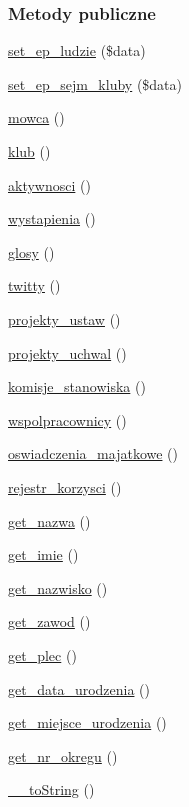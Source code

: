\subsubsection*{Metody publiczne}
\begin{DoxyCompactItemize}
\item 
\hyperlink{classep___posel_a26923a78d5c508d37507edd1b617893c}{set\-\_\-ep\-\_\-ludzie} (\$data)
\item 
\hyperlink{classep___posel_ab890bc062f51edbd126a1b10bd326e71}{set\-\_\-ep\-\_\-sejm\-\_\-kluby} (\$data)
\item 
\hyperlink{classep___posel_a0a281f2a729be7088e24f59b2a897bb6}{mowca} ()
\item 
\hyperlink{classep___posel_aedba85bfa40b8bf60cfad39464010834}{klub} ()
\item 
\hyperlink{classep___posel_af32786fc0cc85c7b2d9d66c3923b3197}{aktywnosci} ()
\item 
\hyperlink{classep___posel_a18b1bf1c04262c23e5edc5c81a4f897c}{wystapienia} ()
\item 
\hyperlink{classep___posel_aab9cc82c80e91ad71187a3c4a9999561}{glosy} ()
\item 
\hyperlink{classep___posel_a8ef2e15fbe3d18191cb256c026a211be}{twitty} ()
\item 
\hyperlink{classep___posel_a77464a8191912ee711ebcaa03fb0bf94}{projekty\-\_\-ustaw} ()
\item 
\hyperlink{classep___posel_a14881c701cfb2df51d012218c1494a51}{projekty\-\_\-uchwal} ()
\item 
\hyperlink{classep___posel_a79f06cfb4c9c98b98876067012f2c413}{komisje\-\_\-stanowiska} ()
\item 
\hyperlink{classep___posel_a7139261a26ea9ad6c952fddb860c80d9}{wspolpracownicy} ()
\item 
\hyperlink{classep___posel_ab7a97df64d38268bc2d006b6666d0275}{oswiadczenia\-\_\-majatkowe} ()
\item 
\hyperlink{classep___posel_a6c022f0121768edc931338ecb59e0dca}{rejestr\-\_\-korzysci} ()
\item 
\hyperlink{classep___posel_ac0818f0049d7b84f08f77128f54cee36}{get\-\_\-nazwa} ()
\item 
\hyperlink{classep___posel_ac4b0c85dc2a130038f2d118dbd0c3d77}{get\-\_\-imie} ()
\item 
\hyperlink{classep___posel_abdd1d7ff92508da7f748ba1feec97af0}{get\-\_\-nazwisko} ()
\item 
\hyperlink{classep___posel_af80ca8310b60004454dd02a387deaa2c}{get\-\_\-zawod} ()
\item 
\hyperlink{classep___posel_ac7f9af5c3fa024e4c26a7b6bd4ce4bb4}{get\-\_\-plec} ()
\item 
\hyperlink{classep___posel_a880b240cd2d8c336fd1709bf0cb1ae2c}{get\-\_\-data\-\_\-urodzenia} ()
\item 
\hyperlink{classep___posel_ac57c08ec5e394a19c5bd9280c8376182}{get\-\_\-miejsce\-\_\-urodzenia} ()
\item 
\hyperlink{classep___posel_a2645a9f0aa5b0ccc482943348c033d0a}{get\-\_\-nr\-\_\-okregu} ()
\item 
\hyperlink{classep___posel_a7516ca30af0db3cdbf9a7739b48ce91d}{\-\_\-\-\_\-to\-String} ()
\end{DoxyCompactItemize}
